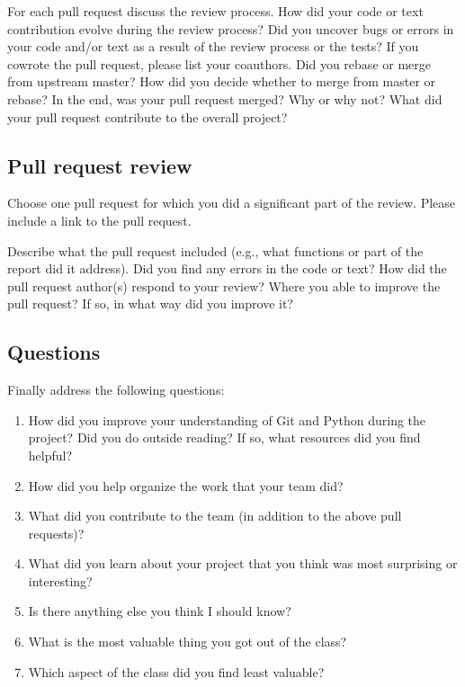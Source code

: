 \documentclass[11pt, oneside]{article}   	%
\begin{document}
For each pull request discuss the review process.  How did your code
or text contribution evolve during the review process?  Did you
uncover bugs or errors in your code and/or text as a result of the
review process or the tests?  If you cowrote the pull request, please
list your coauthors.  Did you rebase or merge from upstream master?
How did you decide whether to merge from master or rebase?
In the end, was your pull request merged?  Why or why not?
What did your pull request contribute to the overall project?

\subsection{Pull request review}

Choose one pull request for which you did a significant part of the review.
Please include a link to the pull request.

Describe what the pull request included (e.g., what functions or part of the
report did it address).  Did you find any errors in the code or text?  How
did the pull request author(s) respond to your review?  Where you able to
improve the pull request?  If so, in what way did you improve it?

\subsection{Questions}

Finally address the following questions:

\begin{enumerate}

\item How did you improve your understanding of Git and Python during the
project?  Did you do outside reading?  If so, what resources did you find
helpful?

\item How did you help organize the work that your team did?

\item What did you contribute to the team (in addition to the above pull requests)?

\item What did you learn about your project that you think was most surprising or interesting?

\item Is there anything else you think I should know?

\item What is the most valuable thing you got out of the class?

\item Which aspect of the class did you find least valuable?

\end{enumerate}
\end{document}
